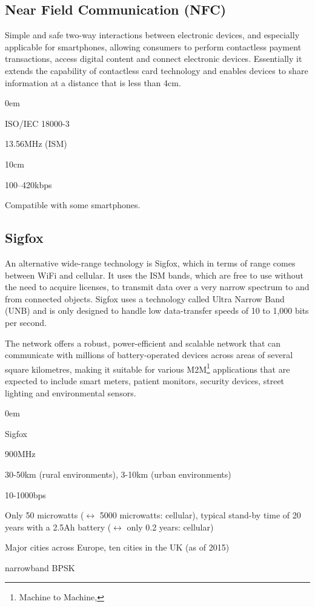 \documentclass[11pt,a4paper,twoside]{article} %
\begin{document}
\subsection{Near Field Communication (NFC)}
Simple and safe two-way interactions between electronic devices, and especially applicable for smartphones, allowing consumers to perform contactless payment transactions, access digital content and connect electronic devices. Essentially it extends the capability of contactless card technology and enables devices to share information at a distance that is less than 4cm.
\vspace{-0.5cm}
\begin{description}
	\itemsep0em
	\item [Standard] ISO/IEC 18000-3
	\item [Frequency] 13.56MHz (ISM)
	\item [Range] 10cm
	\item [Bitrate] 100–420kbps
	\item [Power Usage]
	\item [Infrastructure] Compatible with some smartphones.
	\item [Network topology]
\end{description}


\subsection{Sigfox}
An alternative wide-range technology is Sigfox, which in terms of range comes between WiFi and cellular. It uses the ISM bands, which are free to use without the need to acquire licenses, to transmit data over a very narrow spectrum to and from connected objects. Sigfox uses a technology called Ultra Narrow Band (UNB) and is only designed to handle low data-transfer speeds of 10 to 1,000 bits per second. 

The network offers a robust, power-efficient and scalable network that can communicate with millions of battery-operated devices across areas of several square kilometres, making it suitable for various M2M\footnote{Machine to Machine, } applications that are expected to include smart meters, patient monitors, security devices, street lighting and environmental sensors.
\vspace{-0.5cm}
\begin{description}
	\itemsep0em
	\item [Standard] Sigfox
	\item [Frequency] 900MHz
	\item [Range] 30-50km (rural environments), 3-10km (urban environments)
	\item [Bitrate] 10-1000bps
	\item [Power Usage] Only 50 microwatts ($\leftrightarrow$ 5000 microwatts: cellular), typical stand-by time of 20 years with a 2.5Ah battery ($\leftrightarrow$ only 0.2 years: cellular)
	\item [Infrastructure] Major cities across Europe, ten cities in the UK (as of 2015)
	\item [Network topology]
	\item [Modulation] narrowband BPSK
\end{description}
\end{document}
